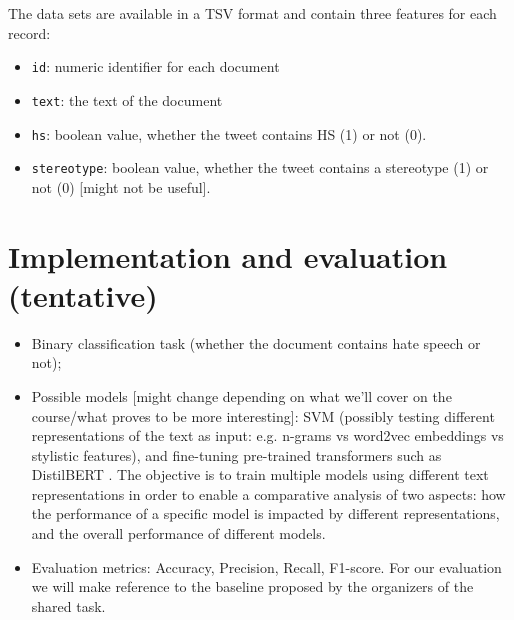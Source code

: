\documentclass[a4paper, 10pt, twocolumn, DIV=calc]{scrartcl}
\begin{document}
The data sets are available in a TSV format and contain three features for each record:
\begin{itemize}
    \item{\texttt{id}:} numeric identifier for each document
    \item{\texttt{text}:} the text of the document
    \item{\texttt{hs}:} boolean value, whether the tweet contains HS (1) or not (0).
    \item{\texttt{stereotype}:} boolean value, whether the tweet contains a stereotype (1) or not (0) [might not be useful].
\end{itemize}

\section{Implementation and evaluation (tentative)}
\begin{itemize}
    \item Binary classification task (whether the document contains hate speech or not);
    \item Possible models [might change depending on what we’ll cover on the course/what proves to be more interesting]: SVM (possibly testing different representations of the text as input: e.g. n-grams vs word2vec embeddings vs stylistic features), and fine-tuning pre-trained transformers such as DistilBERT \cite{distilbert}.
    The objective is to train multiple models using different text representations in order to enable a comparative analysis of two aspects: how the performance of a specific model is impacted by different representations, and the overall performance of different models.
    
    \item Evaluation metrics: Accuracy, Precision, Recall, F1-score.
    For our evaluation we will make reference to the baseline proposed by the organizers of the shared task.

\end{itemize}

\printbibliography{}
\end{document}

